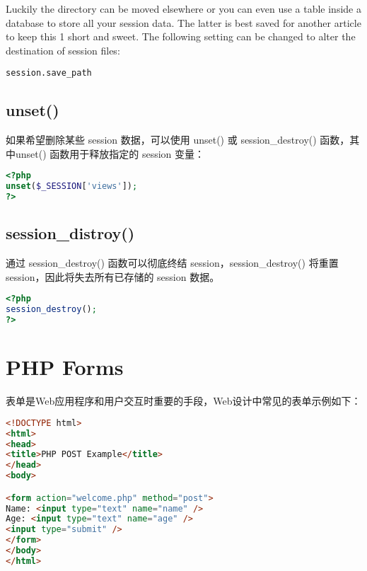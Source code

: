 Luckily the directory can be moved elsewhere or you can even use a table inside a database to store all your session data. The latter is best saved for another article to keep this 1 short and sweet. The following setting can be changed to alter the destination of session files:

\verb|session.save_path|

\section{unset()}

如果希望删除某些 session 数据，可以使用 unset() 或 session\_destroy() 函数，其中unset() 函数用于释放指定的 session 变量：


\begin{lstlisting}[language=PHP]
<?php
unset($_SESSION['views']);
?>
\end{lstlisting}



\section{session\_distroy()}




通过 session\_destroy() 函数可以彻底终结 session，session\_destroy() 将重置 session，因此将失去所有已存储的 session 数据。


\begin{lstlisting}[language=PHP]
<?php
session_destroy();
?>
\end{lstlisting}














\chapter{PHP Forms}

\vspace{-30pt}

表单是Web应用程序和用户交互时重要的手段，Web设计中常见的表单示例如下：

\begin{lstlisting}[language=HTML]
<!DOCTYPE html>
<html>
<head>
<title>PHP POST Example</title>
</head>
<body>

<form action="welcome.php" method="post">
Name: <input type="text" name="name" />
Age: <input type="text" name="age" />
<input type="submit" />
</form>
</body>
</html>
\end{lstlisting}




